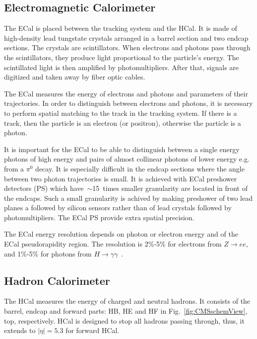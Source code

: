 \subsection{Electromagnetic Calorimeter}

The ECal is placed between the tracking system and the HCal. It is made of high-density lead tungstate crystals arranged in a barrel section and two endcap sections. The crystals are scintillators. When electrons and photons pass through the scintillators, they produce light proportional to the particle's energy. The scintillated light is then amplified by photomultipliers. After that, signals are digitized and taken away by fiber optic cables.

The ECal measures the energy of electrons and photons and parameters of their trajectories. In order to distinguish between electrons and photons, it is necessary to perform spatial matching to the track in the tracking system. If there is a track, then the particle is an electron (or positron), otherwise the particle is a photon.

It is important for the ECal to be able to distinguish between a single energy photons of high energy and pairs of almost collinear photons of lower energy e.g. from a $\pi^0$ decay. It is especially difficult in the endcap sections where the angle between two photon trajectories is small. It is achieved with ECal preshower detectors (PS) which have~$\sim$15~times smaller granularity are located in front of the endcaps. Such a small granularity is achived by making preshower of two lead planes a followed by silicon sensors rather than of lead crystals followed by photomultipliers. The ECal PS provide extra spatial precision. 

The ECal energy resolution depends on photon or electron energy and of the ECal pseudorapidity region. The resolution is 2\%-5\% for electrons from $Z\rightarrow ee$, and 1\%-5\% for photons from $H\rightarrow\gamma\gamma$~\cite{ref_ECalResolution}.



\subsection{Hadron Calorimeter}
\label{sec:Exp_CMS_HCal}
The HCal measures the energy of charged and neutral hadrons. It consists of the barrel, endcap and forward parts: HB, HE and HF in Fig.~\ref{fig:CMSschemView}, top, respectively. HCal is designed to stop all hadrons passing through, thus, it extends to $|\eta|=5.3$ for forward HCal.


